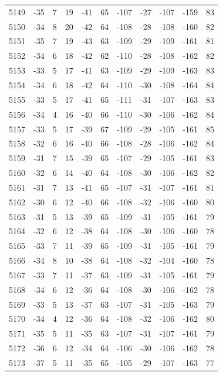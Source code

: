 \begin{table}[H]
\begin{tabular}{lllllllllll}
5149 & -35 & 7 & 19 & -41 & 65 & -107 & -27 & -107 & -159 & 83 \\
5150 & -34 & 8 & 20 & -42 & 64 & -108 & -28 & -108 & -160 & 82 \\
5151 & -35 & 7 & 19 & -43 & 63 & -109 & -29 & -109 & -161 & 81 \\
5152 & -34 & 6 & 18 & -42 & 62 & -110 & -28 & -108 & -162 & 82 \\
5153 & -33 & 5 & 17 & -41 & 63 & -109 & -29 & -109 & -163 & 83 \\
5154 & -34 & 6 & 18 & -42 & 64 & -110 & -30 & -108 & -164 & 84 \\
5155 & -33 & 5 & 17 & -41 & 65 & -111 & -31 & -107 & -163 & 83 \\
5156 & -34 & 4 & 16 & -40 & 66 & -110 & -30 & -106 & -162 & 84 \\
5157 & -33 & 5 & 17 & -39 & 67 & -109 & -29 & -105 & -161 & 85 \\
5158 & -32 & 6 & 16 & -40 & 66 & -108 & -28 & -106 & -162 & 84 \\
5159 & -31 & 7 & 15 & -39 & 65 & -107 & -29 & -105 & -161 & 83 \\
5160 & -32 & 6 & 14 & -40 & 64 & -108 & -30 & -106 & -162 & 82 \\
5161 & -31 & 7 & 13 & -41 & 65 & -107 & -31 & -107 & -161 & 81 \\
5162 & -30 & 6 & 12 & -40 & 66 & -108 & -32 & -106 & -160 & 80 \\
5163 & -31 & 5 & 13 & -39 & 65 & -109 & -31 & -105 & -161 & 79 \\
5164 & -32 & 6 & 12 & -38 & 64 & -108 & -30 & -106 & -160 & 78 \\
5165 & -33 & 7 & 11 & -39 & 65 & -109 & -31 & -105 & -161 & 79 \\
5166 & -34 & 8 & 10 & -38 & 64 & -108 & -32 & -104 & -160 & 78 \\
5167 & -33 & 7 & 11 & -37 & 63 & -109 & -31 & -105 & -161 & 79 \\
5168 & -34 & 6 & 12 & -36 & 64 & -108 & -30 & -106 & -162 & 78 \\
5169 & -33 & 5 & 13 & -37 & 63 & -107 & -31 & -105 & -163 & 79 \\
5170 & -34 & 4 & 12 & -36 & 64 & -108 & -32 & -106 & -162 & 80 \\
5171 & -35 & 5 & 11 & -35 & 63 & -107 & -31 & -107 & -161 & 79 \\
5172 & -36 & 6 & 12 & -34 & 64 & -106 & -30 & -106 & -162 & 78 \\
5173 & -37 & 5 & 11 & -35 & 65 & -105 & -29 & -107 & -163 & 77 \\

\end{tabular}
\end{table}
